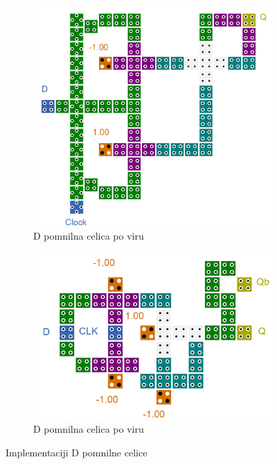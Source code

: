 \documentclass[a4paper, 11pt]{article}
\begin{document}
\begin{figure}[h!]
	\centering
	\begin{subfigure}[b]{0.4\textwidth}
	\includegraphics[width=\textwidth]{../img/vir_4/d.png}
	\caption{D pomnilna celica po viru \cite{quantum_dot}}
	\label{fig-d-1}
	\end{subfigure}
	\begin{subfigure}[b]{0.4\textwidth}
	\includegraphics[width=\textwidth]{../img/vir_5/d.png} 
	\caption{D pomnilna celica po viru \cite{a_novel_approach}}
	\label{fig-d-2}
	\end{subfigure}
	\caption{Implementaciji D pomnilne celice}
	\label{fig-d}
\end{figure}
\end{document}
